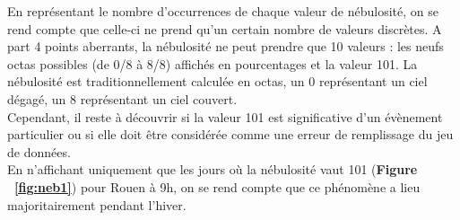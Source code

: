 \documentclass{article} %
\begin{document}
En représentant le nombre d’occurrences de chaque valeur de nébulosité, on se rend compte que celle-ci ne prend qu’un certain nombre de valeurs discrètes. A part 4 points aberrants, la nébulosité ne peut prendre que 10 valeurs : les neufs octas possibles (de 0/8 à 8/8) affichés en pourcentages et la valeur 101. La nébulosité est traditionnellement calculée en octas, un 0 représentant un ciel dégagé, un 8 représentant un ciel couvert.\\

Cependant, il reste à découvrir si la valeur 101 est significative d’un évènement particulier ou si elle doit être considérée comme une erreur de remplissage du jeu de données.\\
En n’affichant uniquement que les jours où la nébulosité vaut 101 (\textbf{Figure ~\ref{fig:neb1}}) pour Rouen à 9h, on se rend compte que ce phénomène a lieu majoritairement pendant l’hiver.
\newpage
\end{document}
